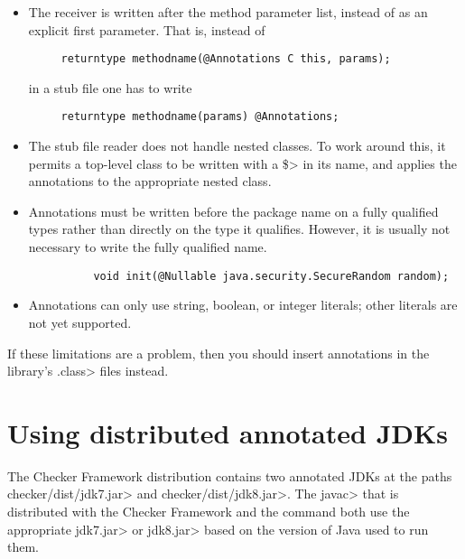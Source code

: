 \begin{itemize}

\item 
  The receiver is written after the method parameter list, instead of as an
  explicit first parameter.  That is, instead of

\begin{Verbatim}
     returntype methodname(@Annotations C this, params);
\end{Verbatim}

\noindent
in a stub file one has to write

\begin{Verbatim}
     returntype methodname(params) @Annotations;
\end{Verbatim}

\item
  The stub file reader
  does not handle nested classes.  To work around this, it permits a
  top-level class to be written with a \<\$> in its name, and applies the
  annotations to the appropriate nested class.

\item
  Annotations must be written before the package name on a fully qualified 
  types rather than directly on the type it qualifies.  However, it is usually not 
  necessary to write the fully qualified name.  
  
  \begin{Verbatim}
          void init(@Nullable java.security.SecureRandom random);
   \end{Verbatim}

\item
  Annotations can only use string, boolean, or integer literals; other literals are not
  yet supported.
\end{itemize}

If these limitations are a problem, then you should insert annotations
in the library's \<.class> files instead.



\section{Using distributed annotated JDKs\label{skeleton-using}\label{skeleton}}

The Checker Framework distribution contains two
annotated JDKs at the paths \<checker/dist/jdk7.jar> and
\<checker/dist/jdk8.jar>.
The \<javac> that is distributed with the Checker Framework and the command
 both use the appropriate \<jdk7.jar> or \<jdk8.jar>
based on the version of Java used to run them.

